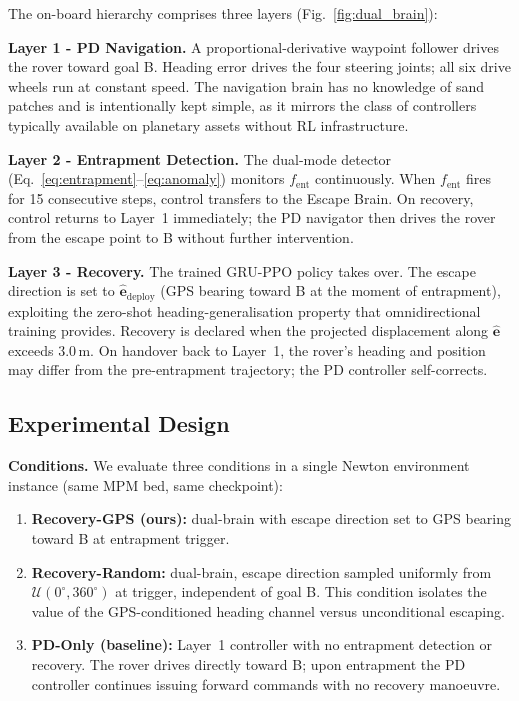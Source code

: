 \documentclass[conference]{IEEEtran}
\begin{document}
The on-board hierarchy comprises three layers (Fig.~\ref{fig:dual_brain}):

\textbf{Layer 1 - PD Navigation.}
A proportional-derivative waypoint follower drives the rover toward goal B.
Heading error drives the four steering joints; all six drive wheels run at
constant speed. The navigation brain has no knowledge of sand patches and is
intentionally kept simple, as it mirrors the class of controllers typically
available on planetary assets without RL infrastructure.

\textbf{Layer 2 - Entrapment Detection.}
The dual-mode detector (Eq.~\eqref{eq:entrapment}--\eqref{eq:anomaly})
monitors $f_\text{ent}$ continuously. When $f_\text{ent}$ fires for 15
consecutive steps, control transfers to the Escape Brain. On recovery, control
returns to Layer~1 immediately; the PD navigator then drives the rover from the
escape point to B without further intervention.

\textbf{Layer 3 - Recovery.}
The trained GRU-PPO policy takes over. The escape direction is set to
$\hat{\mathbf{e}}_\text{deploy}$ (GPS bearing toward B at the moment of
entrapment), exploiting the zero-shot heading-generalisation property that
omnidirectional training provides. Recovery is declared when the projected
displacement along $\hat{\mathbf{e}}$ exceeds $3.0$\,m. On handover back to
Layer~1, the rover's heading and position may differ from the pre-entrapment
trajectory; the PD controller self-corrects.

\subsection{Experimental Design}
\label{sec:sim2sim_design}

\textbf{Conditions.}
We evaluate three conditions in a single Newton environment instance (same
MPM bed, same checkpoint):
\begin{enumerate}
  \item \textbf{Recovery-GPS (ours):} dual-brain with escape direction set to
        GPS bearing toward B at entrapment trigger.
  \item \textbf{Recovery-Random:} dual-brain, escape direction sampled uniformly
        from $\mathcal{U}(0^\circ,360^\circ)$ at trigger, independent of goal B.
        This condition isolates the value of the GPS-conditioned heading channel
        versus unconditional escaping.
  \item \textbf{PD-Only (baseline):} Layer~1 controller with no entrapment
        detection or recovery. The rover drives directly toward B; upon
        entrapment the PD controller continues issuing forward commands with no
        recovery manoeuvre.
\end{enumerate}
\end{document}
